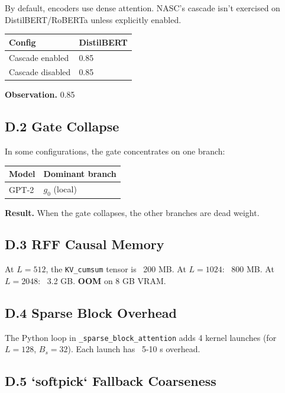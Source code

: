 By default, encoders use dense attention. NASC's cascade isn't exercised 
on DistilBERT/RoBERTa unless explicitly enabled.

\begin{table}[H]
\centering
\small
\begin{tabular}{ll}
\toprule
\textbf{Config} & \textbf{DistilBERT} \\
\midrule
Cascade enabled & 0.85 \\
Cascade disabled & 0.85 \\
\bottomrule
\end{tabular}
\end{table}

\textbf{Observation.} 0.85

\subsection{D.2 Gate Collapse}

In some configurations, the gate concentrates on one branch:

\begin{table}[H]
\centering
\small
\begin{tabular}{ll}
\toprule
\textbf{Model} & \textbf{Dominant branch} \\
\midrule
GPT-2 & $g_0$ (local) \\
\bottomrule
\end{tabular}
\end{table}

\textbf{Result.} When the gate collapses, the other branches are dead weight.

\subsection{D.3 RFF Causal Memory}

At $L = 512$, the \texttt{KV\_cumsum} tensor is ~200 MB. At $L = 1024$: ~800 MB. 
At $L = 2048$: ~3.2 GB. \textbf{OOM} on 8 GB VRAM.

\subsection{D.4 Sparse Block Overhead}

The Python loop in \texttt{\_sparse\_block\_attention} adds 4 kernel launches 
(for $L = 128$, $B_s = 32$). Each launch has ~5-10  s overhead.

\subsection{D.5 `softpick` Fallback Coarseness}

